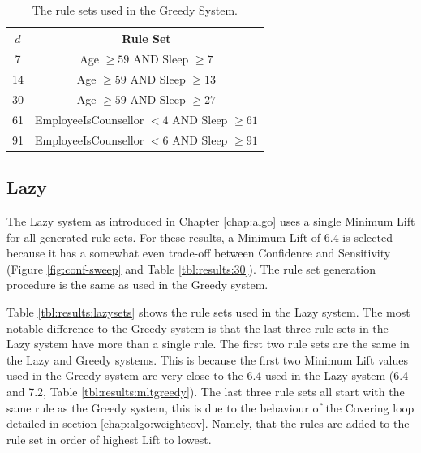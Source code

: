 \begin{table}[h]
	\centering

	\begin{tabular}{cc}
	\toprule
	$d$ & Rule Set \\
	\midrule
	7	& Age $\geq 59$ AND Sleep $\geq 7$ \\
	\midrule
	14	& Age $\geq 59$ AND Sleep $\geq 13$ \\
	\midrule
	30	& Age $\geq 59$ AND Sleep $\geq 27$ \\
	\midrule
	61	& EmployeeIsCounsellor $< 4$ AND Sleep $\geq 61$ \\
	\midrule
	91	& EmployeeIsCounsellor $< 6$ AND Sleep $\geq 91$ \\

	\bottomrule
	\end{tabular}

	\caption{The rule sets used in the Greedy System.}
	\label{tbl:results:greedysets}
\end{table}



\subsection{Lazy}

The Lazy system as introduced in Chapter \ref{chap:algo} uses a single Minimum Lift for all generated rule sets. For these results, a Minimum Lift of 6.4 is selected because it has a somewhat even trade-off between Confidence and Sensitivity (Figure \ref{fig:conf-sweep} and Table \ref{tbl:results:30}). The rule set generation procedure is the same as used in the Greedy system.

Table \ref{tbl:results:lazysets} shows the rule sets used in the Lazy system. The most notable difference to the Greedy system is that the last three rule sets in the Lazy system have more than a single rule. The first two rule sets are the same in the Lazy and Greedy systems. This is because the first two Minimum Lift values used in the Greedy system are very close to the 6.4 used in the Lazy system (6.4 and 7.2, Table \ref{tbl:results:mltgreedy}). The last three rule sets all start with the same rule as the Greedy system, this is due to the behaviour of the Covering loop detailed in section \ref{chap:algo:weightcov}. Namely, that the rules are added to the rule set in order of highest Lift to lowest.

